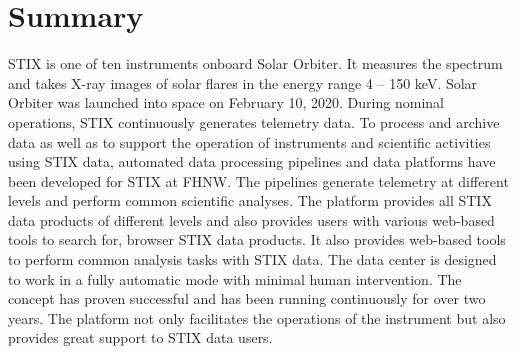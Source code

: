 \documentclass[referee]{aa} %
\begin{document}
\section{Summary}
\label{sec:summary}
STIX is one of ten instruments onboard Solar Orbiter.
 It measures the spectrum and takes X-ray images of solar 
 flares in the energy range 4 -- 150 keV. Solar Orbiter was launched into space on February 10, 2020. 
 During nominal operations, STIX continuously generates telemetry data. 
 To process and archive data as well as to support the operation of 
 instruments and scientific activities using STIX data, 
 automated data processing pipelines and data platforms have been 
 developed for STIX at FHNW. 
 The pipelines generate telemetry at different levels and perform common scientific analyses. 
 The platform provides 
 all STIX data products of different levels and also provides users 
 with various web-based tools to search for,  browser STIX data products. 
 It also provides web-based tools to perform common analysis tasks with STIX data. 
  The data center is designed to work in a 
 fully automatic mode with minimal human intervention. The concept has proven successful 
 and has been running continuously for over two years.
The platform not only facilitates the operations of the instrument but also provides great support to STIX data users.





\end{document}
